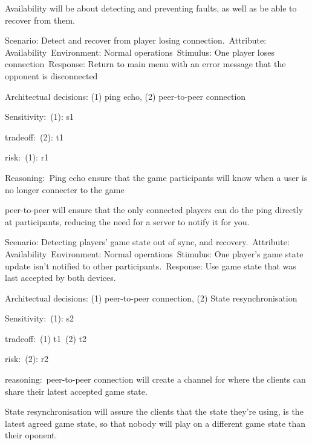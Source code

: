 
Availability will be about detecting and preventing faults, as well as be able to recover from them.

Scenario: Detect and recover from player losing connection.\
Attribute: Availability\
Environment: Normal operations\
Stimulus: One player loses connection\
Response: Return to main menu with an error message that the opponent is disconnected\

Architectual decisions: (1) ping echo, (2) peer-to-peer connection

Sensitivity:\
(1): s1\

tradeoff:\
(2): t1

risk:\
(1): r1


Reasoning:\
Ping echo ensure that the game participants will know when a user is no longer connecter to the game

peer-to-peer will ensure that the only connected players can do the ping directly at participants, reducing the need for a server to notify it for you.


Scenario: Detecting players' game state out of sync, and recovery.\
Attribute: Availability\
Environment: Normal operations\
Stimulus: One player's game state update isn't notified to other participants.\
Response: Use game state that was last accepted by both devices.\

Architectual decisions: (1) peer-to-peer connection, (2) State resynchronisation

Sensitivity:\
(1): s2\

tradeoff:\
(1) t1\
(2) t2\

risk:\
(2): r2\

reasoning:\
peer-to-peer connection will create a channel for where the clients can share their latest accepted game state.

State resynchronisation will assure the clients that the state they're using, is the latest agreed game state, so that nobody will play on a different game state than their oponent.
